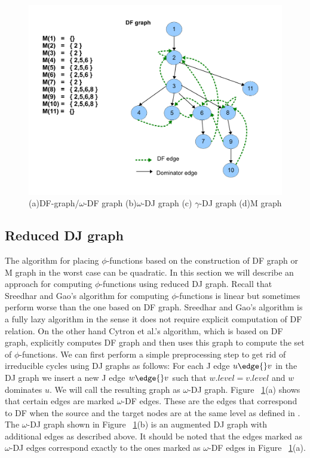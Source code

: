     \begin{figure}[htb]
    \centerline{\includegraphics[scale=0.4]{mgraph_1.pdf}}
    \caption{(a)DF-graph/$\omega$-DF graph (b)$\omega$-DJ graph (c) $\gamma$-DJ graph (d)M graph}
    \label{fig:mgraph}
    \end{figure} 


\subsection{Reduced DJ graph}

The algorithm for placing $\phi$-functions based on the construction of DF graph or M graph 
in the worst case can be quadratic. In this section we will describe an approach for
computing $\phi$-functions using reduced DJ graph. Recall that
Sreedhar and Gao's algorithm for computing $\phi$-functions is linear but sometimes perform
worse than the one based on DF graph. Sreedhar and Gao's algorithm is a fully lazy algorithm
in the sense it does not require explicit computation of DF relation. On the
other hand Cytron et al.'s algorithm, which is based on DF graph, explicitly
computes DF graph and then uses this graph to compute the set of $\phi$-functions. 
We can first perform a simple preprocessing step to get rid of
irreducible cycles using DJ graphs as follows: For each J edge $u \edge{} v$
in the DJ graph we insert a new J edge $w \edge{} v$ such that $w.level = v.level$ and
$w$ dominates $u$. We will call the resulting graph as $\omega$-DJ graph. 
Figure ~\ref{fig:mgraph}(a) shows that certain edges are marked $\omega$-DF edges. These are the
edges that correspond to DF when the source and the target nodes are at the same level as
defined in \cite{bilardi}. The
$\omega$-DJ graph shown in Figure ~\ref{fig:mgraph}(b) is an augmented DJ graph with additional 
edges as described above. It should be noted that the edges marked as $\omega$-DJ edges 
correspond exactly to the ones marked as $\omega$-DF edges in Figure ~\ref{fig:mgraph}(a). 


